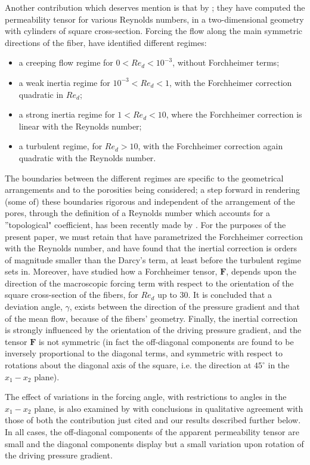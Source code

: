 Another contribution which deserves mention is that by \citet{lasseux}; they have computed the permeability tensor 
for various Reynolds numbers, in a two-dimensional geometry with cylinders of square cross-section.
Forcing the flow along the main symmetric directions of the fiber, \citet{lasseux} have identified different regimes:
\begin{itemize}
	\item a creeping flow regime for $ 0 < Re_d < 10^{-3}$, without Forchheimer terms;
	\item a weak inertia regime for $10^{-3} < Re_d < 1$, with the Forchheimer correction quadratic in $Re_d$; 
	\item a strong inertia regime for $1 < Re_d < 10$, where the Forchheimer correction is linear with the Reynolds number; 
	\item a turbulent regime, for  $Re_d > 10 $, with the Forchheimer correction again quadratic with the Reynolds number.
\end{itemize}  
The boundaries between the different regimes are specific to the geometrical arrangements and to the porosities being considered; 
a step forward in rendering (some of) these boundaries rigorous and independent of the arrangement of the pores, through the definition 
of a Reynolds number which accounts for a ''topological" coefficient, has been recently made by \citet{pauthenet}. 
For the purposes of the present paper, we must retain that \citet{lasseux} have parametrized the Forchheimer correction with the Reynolds 
number, and have found that the inertial correction is orders of magnitude smaller than the Darcy's term, at least before the turbulent 
regime sets in. Moreover, \citet{lasseux} have studied how a Forchheimer tensor, $\mathbf{F}$, depends upon the direction of the
macroscopic forcing term with respect to the orientation of the square cross-section of the fibers, for  $Re_d$ up to 30.
It is concluded that a deviation angle, $\gamma$, exists between the direction of the pressure gradient and that of the mean flow,
because of the fibers' geometry. Finally, the inertial correction is strongly influenced by the orientation
of the driving pressure gradient, and the tensor $\mathbf{F}$ is not symmetric (in fact the off-diagonal components 
are found to be inversely proportional to the diagonal terms, and symmetric with respect to rotations about the diagonal axis of 
the square, i.e. the direction at $45^\circ$ in the $x_1 - x_2$ plane).

The effect of variations in the forcing angle, with restrictions to angles in the $x_1 - x_2$ plane, is also examined by 
\citet{soulaine2014} with conclusions in qualitative agreement with those of  both the contribution just cited and our results  
described further below. In all cases, the off-diagonal components of the apparent permeability tensor are small and the diagonal 
components display but a small variation upon rotation of the driving pressure gradient.



